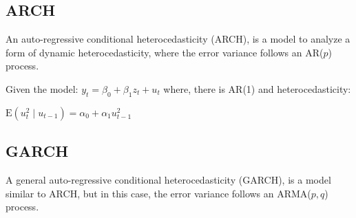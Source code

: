 \documentclass[10pt, a4paper, landscape]{article}
\newcommand{\E}{\mathrm{E}}
\begin{document}
\begin{multicols}{3}
		\subsection*{ARCH}
		
		An auto-regressive conditional heterocedasticity (ARCH), is a model to analyze a form of dynamic heterocedasticity, where the error variance follows an AR($p$) process.
		
		Given the model: $y_{t} = \beta_{0} + \beta_{1} z_{t} + u_{t}$ where, there is AR(1) and heterocedasticity:
		
		\begin{center}
			$\E(u^{2}_{t} \mid u_{t - 1}) = \alpha_{0} + \alpha_{1} u^{2}_{t - 1}$
		\end{center}
		
		\subsection*{GARCH}
		
		A general auto-regressive conditional heterocedasticity (GARCH), is a model similar to ARCH, but in this case, the error variance follows an ARMA($p, q$) process.
	\end{multicols}
\end{document}
